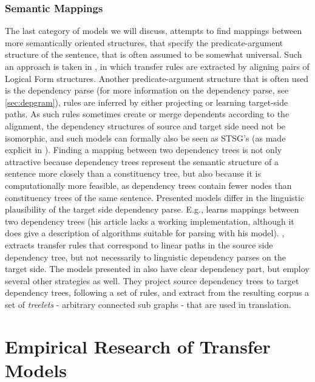\documentclass{report}
\theoremstyle{definition}
\theoremstyle{plain}
\begin{document}
\subsection{Semantic Mappings}

The last category of models we will discuss, attempts to find mappings between more semantically oriented structures, that specify the predicate-argument structure of the sentence, that is often assumed to be somewhat universal. Such an approach is taken in \cite{menezes2003best}, in which transfer rules are extracted by aligning pairs of Logical Form structures. Another predicate-argument structure that is often used is the dependency parse (for more information on the dependency parse, see \ref{sec:depgram}), rules are inferred by either projecting or learning target-side paths. As such rules sometimes create or merge dependents according to the alignment, the dependency structures of source and target side need not be isomorphic, and such models can formally also be seen as STSG's (as made explicit in \cite{eisner2003learning}). Finding a mapping between two dependency trees is not only attractive because dependency trees represent the semantic structure of a sentence more closely than a constituency tree, but also because it is computationally more feasible, as dependency trees contain fewer nodes than constituency trees of the same sentence. Presented models differ in the linguistic plausibility of the target side dependency parse. E.g., \cite{eisner2003learning} learns mappings between two dependency trees (his article lacks a working implementation, although it does give a description of algorithms suitable for parsing with his model). \cite{lin2004path}, extracts transfer rules that correspond to linear paths in the source side dependency tree, but not necessarily to linguistic dependency parses on the target side. The models presented in \cite{quirk2005dependency,quirk2006dependency,quirk2006we} also have clear dependency part, but employ several other strategies as well. They project source dependency trees to target dependency trees, following a set of rules, and extract from the resulting corpus a set of \textit{treelets} - arbitrary connected sub graphs - that are used in translation.

 
 
 
\chapter{Empirical Research of Transfer Models}
\label{ch:empirical} 
\end{document}
